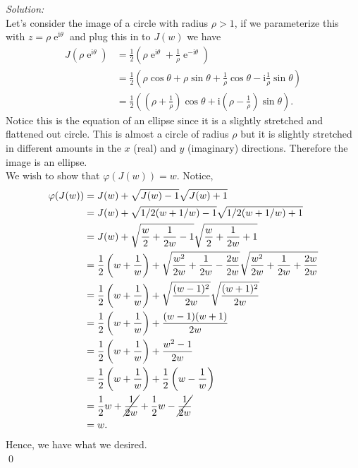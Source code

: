 \documentclass[10pt]{amsart}
\newcommand{\I}{\mathrm{i}}
\DeclareMathOperator{\E}{e}
\theoremstyle{nonumberplain}
\begin{document}
\begin{enumerate}[label={\bf {\arabic*}:}]
\begin{enumerate}
\noindent
\textit{Solution:} \\
Let's consider the image of a circle with radius $\rho > 1$, if we parameterize this with $z = \rho \E^{\I \theta}$ and plug this in to $J(w)$ we have
\begin{align*}
J(\rho\E^{\I \theta})
	&= \frac 1 2 \left( \rho\E^{\I \theta} + \frac 1 \rho \E^{-\I \theta} \right) \\
	&= \frac 1 2 \left( \rho \cos \theta + \rho \sin \theta + \frac 1 \rho \cos \theta - \I \frac 1 \rho \sin \theta \right) \\
	&= \frac 1 2 \left( \left( \rho + \frac 1 \rho\right) \cos \theta + \I \left( \rho  - \frac 1 \rho \right) \sin \theta \right).
\end{align*}
Notice this is the equation of an ellipse since it is a slightly stretched and flattened out circle.
This is almost a circle of radius $\rho$ but it is slightly stretched in different amounts in the $x$ (real) and $y$ (imaginary) directions.
Therefore the image is an ellipse. \\

\noindent
We wish to show that $\varphi(J(w)) = w $.
Notice, 
\begin{align*}
\varphi(J(w)) &= J(w) + \sqrt{J(w) - 1}\sqrt{J(w) + 1} \\
	&= J(w) + \sqrt{1/2 (w + 1/w) - 1}\sqrt{1/2 (w + 1/w) + 1 } \\
	&= J(w) + \sqrt{\frac w 2 + \frac 1 {2w} - 1}\sqrt{\frac w 2 + \frac 1 {2w} + 1 } \\
	&= \frac 1 2 \left( w + \frac 1 w \right) + \sqrt{\frac {w^2} {2w} + \frac 1 {2w} - \frac {2w}{2w} }\sqrt{\frac {w^2} {2w} + \frac 1 {2w} + \frac {2w}{2w}  } \\
	&= \frac 1 2 \left( w + \frac 1 w \right) + \sqrt{\frac {(w - 1)^2} {2w} }\sqrt{\frac {(w + 1)^2} {2w}   } \\
	&= \frac 1 2 \left( w + \frac 1 w \right) + \frac {(w - 1)(w + 1)} {2w} \\
	&= \frac 1 2 \left( w + \frac 1 w \right) + \frac {w^2 - 1} {2w} \\
	&= \frac 1 2 \left( w + \frac 1 w \right) + \frac 1 2 \left( w - \frac 1 w \right) \\
	&= \frac 1 2 w + \cancel{\frac 1 {2w}} + \frac 1 2 w - \cancel{\frac 1 {2w}} \\
	&= w.
\end{align*}
Hence, we have what we desired. \\
\qed \\


\end{enumerate}
\end{enumerate}
\end{document}
